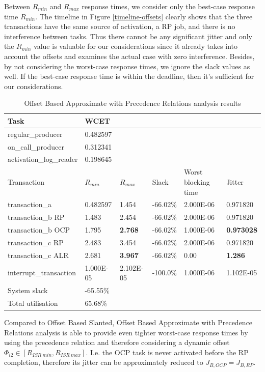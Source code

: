 \documentclass{article}
\begin{document}
Between $R_{min}$ and $R_{max}$ response times, we consider only the best-case response time $R_{min}$. The timeline in Figure \ref{timeline-offsets} clearly shows that the three transactions have the same source of activation, a RP job, and there is no interference between tasks. Thus there cannot be any significant jitter and only the $R_{min}$ value is valuable for our considerations since it already takes into account the offsets and examines the actual case with zero interference. Besides, by not considering the worst-case response times, we ignore the slack values as well. If the best-case response time is within the deadline, then it's sufficient for our considerations.

\begin{table}[!htbp]
  \centering
  \begin{tabular}{llllll}
   \toprule
   Task & WCET \\
   \midrule
   regular\_producer & 0.482597 \\
   on\_call\_producer & 0.312341 \\
   activation\_log\_reader & 0.198645 \\
   \toprule
   \toprule
   Transaction & $R_{min}$ & $R_{max}$ & Slack & Worst blocking time & Jitter \\
   \midrule
   transaction\_a & 0.482597 & 1.454 & -66.02\% &  2.000E-06 & 0.971820 \\
   transaction\_b RP & 1.483 & 2.454 & -66.02\% & 2.000E-06 & 0.971820 \\
   transaction\_b OCP & 1.795 & \textbf{2.768} & -66.02\% & 1.000E-06 & \textbf{0.973028} \\
   transaction\_c RP & 2.483 & 3.454 & -66.02\% & 2.000E-06 & 0.971820 \\
   transaction\_c ALR & 2.681 & \textbf{3.967} & -66.02\% & 0.00 & \textbf{1.286} \\
   interrupt\_transaction & 1.000E-05 & 2.102E-05 & -100.0\% & 1.000E-06 & 1.102E-05 \\
   \toprule
   \toprule
   System slack & -65.55\% \\
   Total utilisation & 65.68\% \\
  \end{tabular}
  \caption{Offset Based Approximate with Precedence Relations analysis results }
  \label{tab:off-approx-w-pr-fps}
\end{table}

Compared to Offset Based Slanted, Offset Based Approximate with Precedence Relations analysis is able to provide even tighter worst-case response times by using the precedence relation and therefore considering a dynamic offset $\Phi_{i2} \in [R_{ISR\ min}, R_{ISR\ max}]$. I.e. the OCP task is never activated before the RP completion, therefore its jitter can be approximately reduced to $J_{B, OCP} = J_{B, RP}$.
\end{document}
